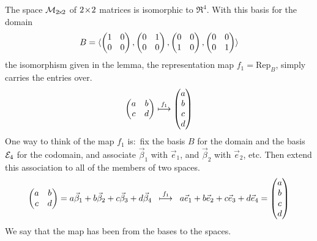 \begin{example}
The space $\mathcal{M}_{2 \! \times \! 2}$ of $2 \! \times \! 2$ matrices is isomorphic to 
$\Re^4$.
With this basis for the domain
\begin{equation*}
  B=\langle\begin{pmatrix}
                1  &0  \\
                0  &0
              \end{pmatrix},
              \begin{pmatrix}
                0  &1  \\
                0  &0
              \end{pmatrix},
              \begin{pmatrix}
                0  &0  \\
                1  &0
              \end{pmatrix},
              \begin{pmatrix}
                0  &0  \\
                0  &1
              \end{pmatrix} \rangle
\end{equation*}
the isomorphism given in the lemma, the representation map $f_1=\mbox{Rep}_B$,
simply carries the entries over.
\begin{equation*}
  \begin{pmatrix}
    a  &b  \\
    c  &d
  \end{pmatrix}
  \stackrel{f_1}{\longmapsto}
  \begin{pmatrix} a \\ b \\ c \\ d \end{pmatrix}
\end{equation*}
One way to think of the map $f_1$ is:~fix the basis $B$ for 
the domain and the basis ${\cal E}_4$ for the codomain, and 
associate $\vec{\beta}_1$ with $\vec{e}_1$, 
and $\vec{\beta}_2$ with $\vec{e}_2$, etc.
Then extend this association to all of the members of two spaces.
\begin{equation*}
  \begin{pmatrix}
    a  &b  \\
    c  &d
  \end{pmatrix}
  =a\vec{\beta}_1+b\vec{\beta}_2+c\vec{\beta}_3+d\vec{\beta}_4
  \;\;\stackrel{f_1}{\longmapsto}\;\;
  a\vec{e}_1+b\vec{e}_2+c\vec{e}_3+d\vec{e}_4
  =\begin{pmatrix} a \\ b \\ c \\ d \end{pmatrix}
\end{equation*}
We say that the map has been 
from the bases to the spaces.


\end{example}

